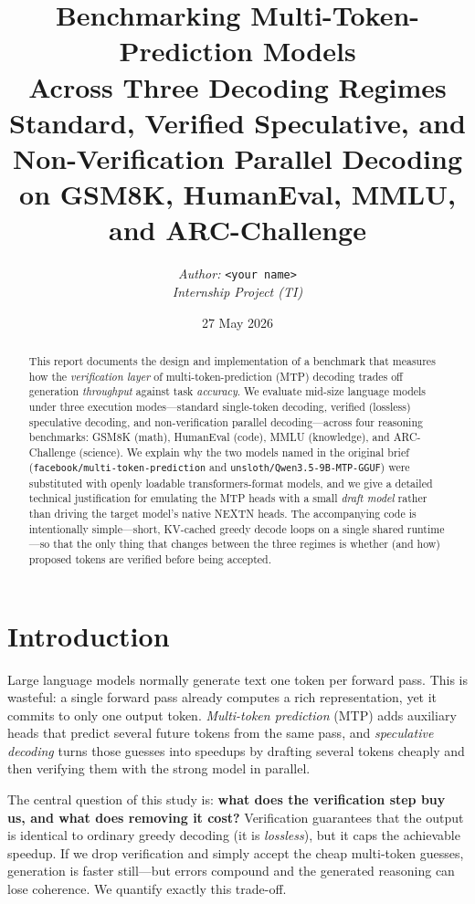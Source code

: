\documentclass[11pt]{article}
\title{\textbf{Benchmarking Multi-Token-Prediction Models\\
Across Three Decoding Regimes}\\[4pt]
\large Standard, Verified Speculative, and Non-Verification Parallel Decoding\\
on GSM8K, HumanEval, MMLU, and ARC-Challenge}
\author{\textit{Author:} \texttt{<your name>} \\ \textit{Internship Project (TI)}}
\date{27 May 2026}
\begin{document}
\maketitle

\begin{abstract}
This report documents the design and implementation of a benchmark that
measures how the \emph{verification layer} of multi-token-prediction (MTP)
decoding trades off generation \emph{throughput} against task \emph{accuracy}.
We evaluate mid-size language models under three execution modes---standard
single-token decoding, verified (lossless) speculative decoding, and
non-verification parallel decoding---across four reasoning benchmarks: GSM8K
(math), HumanEval (code), MMLU (knowledge), and ARC-Challenge (science). We
explain why the two models named in the original brief
(\texttt{facebook/multi-token-prediction} and
\texttt{unsloth/Qwen3.5-9B-MTP-GGUF}) were substituted with openly loadable
transformers-format models, and we give a detailed technical justification for
emulating the MTP heads with a small \emph{draft model} rather than driving the
target model's native NEXTN heads. The accompanying code is intentionally
simple---short, KV-cached greedy decode loops on a single shared runtime---so
that the only thing that changes between the three regimes is whether (and how)
proposed tokens are verified before being accepted.
\end{abstract}

\tableofcontents
\bigskip

\section{Introduction}
Large language models normally generate text one token per forward pass. This
is wasteful: a single forward pass already computes a rich representation, yet
it commits to only one output token. \emph{Multi-token prediction} (MTP) adds
auxiliary heads that predict several future tokens from the same pass, and
\emph{speculative decoding} turns those guesses into speedups by drafting
several tokens cheaply and then verifying them with the strong model in
parallel.

The central question of this study is: \textbf{what does the verification step
buy us, and what does removing it cost?} Verification guarantees that the output
is identical to ordinary greedy decoding (it is \emph{lossless}), but it caps
the achievable speedup. If we drop verification and simply accept the cheap
multi-token guesses, generation is faster still---but errors compound and the
generated reasoning can lose coherence. We quantify exactly this trade-off.
\end{document}
